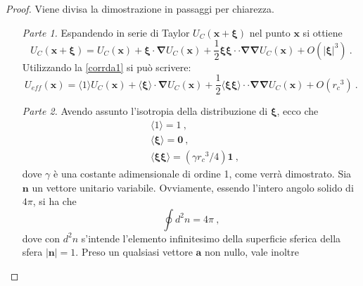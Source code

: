 \documentclass[12pt,a4paper]{report}
\numberwithin{equation}{section}
\numberwithin{section}{chapter}
\begin{document}
	\begin{proof}
		Viene divisa la dimostrazione in passaggi per chiarezza.
		\begin{enumerate} [leftmargin=0pt, itemindent=2.67\parindent]
			\item [\textit{Parte 1.}] Espandendo in serie di Taylor $U_C(\boldsymbol{x} + \boldsymbol{\xi})$ nel punto $\boldsymbol{x}$ si ottiene
			\begin{equation}
			\label{corrda3}
			U_C(\boldsymbol{x} + \boldsymbol{\xi}) = U_C(\boldsymbol{x}) + \boldsymbol{\xi} \cdot \boldsymbol{\nabla}U_C(\boldsymbol{x}) + \frac{1}{2} \boldsymbol{\xi}\boldsymbol{\xi} \cdot\cdot \boldsymbol{\nabla}\boldsymbol{\nabla}U_C(\boldsymbol{x}) + O(|\boldsymbol{\xi}|^3)~.
			\end{equation}
			Utilizzando la \eqref{corrda1} si pu\`o scrivere:
			\begin{equation}
			\label{corrda4}
			U_{eff}(\boldsymbol{x}) = \langle 1 \rangle U_C(\boldsymbol{x}) + \langle \boldsymbol{\xi} \rangle \cdot \boldsymbol{\nabla} U_C(\boldsymbol{x}) + \frac{1}{2}\langle \boldsymbol{\xi}\boldsymbol{\xi} \rangle \cdot \cdot \boldsymbol{\nabla}\boldsymbol{\nabla} U_C(\boldsymbol{x}) + O({r_c}^3)~.
			\end{equation}
		\item [\textit{Parte 2.}] Avendo assunto l'isotropia della distribuzione di $\boldsymbol{\xi}$, ecco che
		\begin{subequations}
		\begin{align}
			&\langle 1 \rangle  = 1~,\label{corrda5:first}\\
			&\langle \boldsymbol{\xi} \rangle = \boldsymbol{0}~,\label{corrda5:second}\\
			&\langle \boldsymbol{\xi}\boldsymbol{\xi} \rangle = (\gamma{r_c}^3/4)\boldsymbol{1}~,\label{corrda5:third}
		\end{align}
		\end{subequations}
		dove $\gamma$ \`e una costante adimensionale di ordine 1, come verr\`a dimostrato. Sia $\boldsymbol{n}$ un vettore unitario variabile. Ovviamente, essendo l'intero angolo solido di $4\pi$, si ha che
		\begin{equation}
		\label{corrda6}
		\oint d^2n = 4\pi~,
		\end{equation}
		dove con $d^2n$ s'intende l'elemento infinitesimo della superficie sferica della sfera $|\boldsymbol{n}|=1$.
		Preso un qualsiasi vettore $\boldsymbol{a}$ non nullo, vale inoltre
		\begin{equation}
		\label{corrda7}

\end{equation}
\end{enumerate}
\end{proof}
\end{document}
